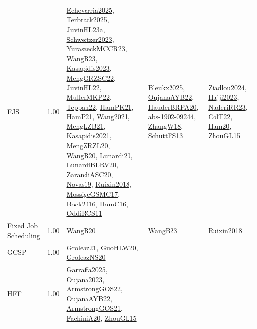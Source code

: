 {\begin{longtable}{p{3cm}r>{\raggedright\arraybackslash}p{6cm}>{\raggedright\arraybackslash}p{6cm}>{\raggedright\arraybackslash}p{8cm}}
\index{FJS}\index{Classification!FJS}FJS &  1.00 & \hyperref[detail:Echeverria2025]{Echeverria2025}, \hyperref[detail:Terbrack2025]{Terbrack2025}, \hyperref[detail:JuvinHL23a]{JuvinHL23a}, \hyperref[detail:Schweitzer2023]{Schweitzer2023}, \hyperref[detail:YuraszeckMCCR23]{YuraszeckMCCR23}, \hyperref[detail:WangB23]{WangB23}, \hyperref[detail:Kasapidis2023]{Kasapidis2023}, \hyperref[detail:MengGRZSC22]{MengGRZSC22}, \hyperref[detail:JuvinHL22]{JuvinHL22}, \hyperref[detail:MullerMKP22]{MullerMKP22}, \hyperref[detail:Teppan22]{Teppan22}, \hyperref[detail:HamPK21]{HamPK21}, \hyperref[detail:HamP21]{HamP21}, \hyperref[detail:Wang2021]{Wang2021}, \hyperref[detail:MengLZB21]{MengLZB21}, \hyperref[detail:Kasapidis2021]{Kasapidis2021}, \hyperref[detail:MengZRZL20]{MengZRZL20}, \hyperref[detail:WangB20]{WangB20}, \hyperref[detail:Lunardi20]{Lunardi20}, \hyperref[detail:LunardiBLRV20]{LunardiBLRV20}, \hyperref[detail:ZarandiASC20]{ZarandiASC20}, \hyperref[detail:Novas19]{Novas19}, \hyperref[detail:Ruixin2018]{Ruixin2018}, \hyperref[detail:MossigeGSMC17]{MossigeGSMC17}, \hyperref[detail:Boek2016]{Boek2016}, \hyperref[detail:HamC16]{HamC16}, \hyperref[detail:OddiRCS11]{OddiRCS11} & \hyperref[detail:Bleukx2025]{Bleukx2025}, \hyperref[detail:OujanaAYB22]{OujanaAYB22}, \hyperref[detail:HauderBRPA20]{HauderBRPA20}, \hyperref[detail:abs-1902-09244]{abs-1902-09244}, \hyperref[detail:ZhangW18]{ZhangW18}, \hyperref[detail:SchuttFS13]{SchuttFS13} & \hyperref[detail:Ziadlou2024]{Ziadlou2024}, \hyperref[detail:Hajji2023]{Hajji2023}, \hyperref[detail:NaderiRR23]{NaderiRR23}, \hyperref[detail:ColT22]{ColT22}, \hyperref[detail:Ham20]{Ham20}, \hyperref[detail:ZhouGL15]{ZhouGL15}\\
\index{Fixed Job Scheduling}\index{Classification!Fixed Job Scheduling}Fixed Job Scheduling &  1.00 & \hyperref[detail:WangB20]{WangB20} & \hyperref[detail:WangB23]{WangB23} & \hyperref[detail:Ruixin2018]{Ruixin2018}\\
\index{GCSP}\index{Classification!GCSP}GCSP &  1.00 & \hyperref[detail:Groleaz21]{Groleaz21}, \hyperref[detail:GuoHLW20]{GuoHLW20}, \hyperref[detail:GroleazNS20]{GroleazNS20} &  & \\
\index{HFF}\index{Classification!HFF}HFF &  1.00 & \hyperref[detail:Garraffa2025]{Garraffa2025}, \hyperref[detail:Oujana2023]{Oujana2023}, \hyperref[detail:ArmstrongGOS22]{ArmstrongGOS22}, \hyperref[detail:OujanaAYB22]{OujanaAYB22}, \hyperref[detail:ArmstrongGOS21]{ArmstrongGOS21}, \hyperref[detail:FachiniA20]{FachiniA20}, \hyperref[detail:ZhouGL15]{ZhouGL15} &  & \\

\end{longtable}}
